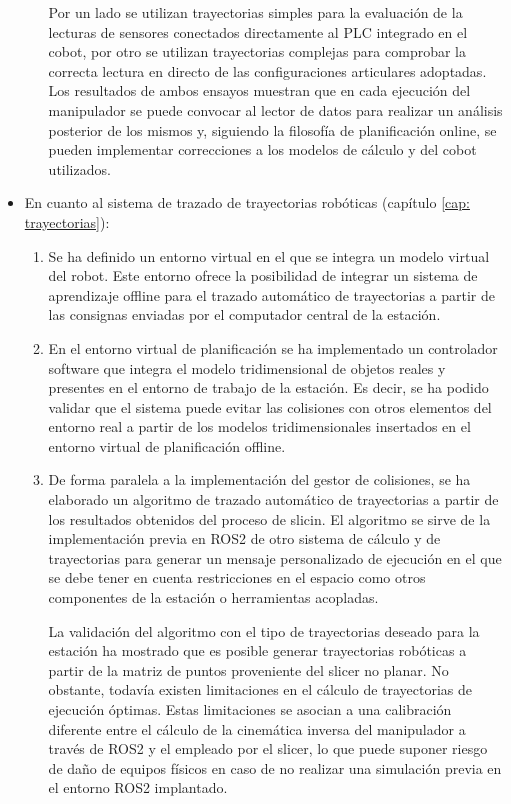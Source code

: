 \begin{itemize}
\begin{enumerate}
        Por un lado se utilizan trayectorias simples para la evaluación de la lecturas de sensores conectados directamente al \acrshort{PLC} integrado en el cobot, por otro se utilizan trayectorias complejas para comprobar la correcta lectura en directo de las configuraciones articulares adoptadas. Los resultados de ambos ensayos muestran que en cada ejecución del manipulador se puede convocar al lector de datos para realizar un análisis posterior de los mismos y, siguiendo la filosofía de planificación online, se pueden implementar correcciones a los modelos de cálculo y del cobot utilizados.
    \end{enumerate}

    \item En cuanto al sistema de trazado de trayectorias robóticas (capítulo \ref{cap: trayectorias}):
    \begin{enumerate}
        \item Se ha definido un entorno virtual en el que se integra un modelo virtual del robot. Este entorno ofrece la posibilidad de integrar un sistema de aprendizaje offline para el trazado automático de trayectorias a partir de las consignas enviadas por el computador central de la estación.
        \item En el entorno virtual de planificación se ha implementado un controlador software que integra el modelo tridimensional de objetos reales y presentes en el entorno de trabajo de la estación. Es decir, se ha podido validar que el sistema puede evitar las colisiones con otros elementos del entorno real a partir de los modelos tridimensionales insertados en el entorno virtual de planificación offline.
        \item De forma paralela a la implementación del gestor de colisiones, se ha elaborado un algoritmo de trazado automático de trayectorias a partir de los resultados obtenidos del proceso de slicin. El algoritmo se sirve de la implementación previa en ROS2 de otro sistema de cálculo y de trayectorias para generar un mensaje personalizado de ejecución en el que se debe tener en cuenta restricciones en el espacio como otros componentes de la estación o herramientas acopladas. 
        
        La validación del algoritmo con el tipo de trayectorias deseado para la estación ha mostrado que es posible generar trayectorias robóticas a partir de la matriz de puntos proveniente del slicer no planar. No obstante, todavía existen limitaciones en el cálculo de trayectorias de ejecución óptimas. Estas limitaciones se asocian a una calibración diferente entre el cálculo de la cinemática inversa del manipulador a través de ROS2 y el empleado por el slicer, lo que puede suponer riesgo de daño de equipos físicos en caso de no realizar una simulación previa en el entorno ROS2 implantado.


\end{enumerate}
\end{itemize}
